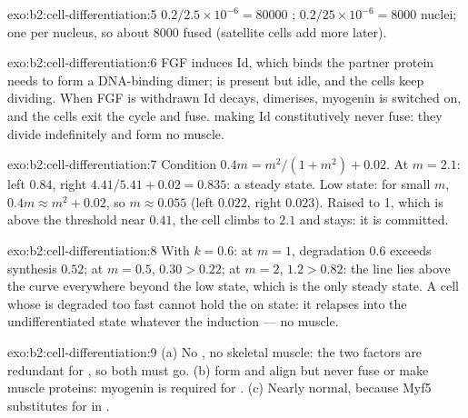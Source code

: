 \begin{solution}{exo:b2:cell-differentiation:5}
$0.2/2.5\times 10^{-6} = \num{80000}$ ; $0.2/25\times 10^{-6}
= \num{8000}$ nuclei; one  per nucleus, so about \num{8000}
 fused (satellite cells add more later).
\end{solution}

\begin{solution}{exo:b2:cell-differentiation:6}
FGF induces Id, which binds the partner protein  needs to form a
DNA-binding dimer;  is present but idle, and the cells keep
dividing. When FGF is withdrawn Id decays,  dimerises, myogenin
is switched on, and the cells exit the cycle and fuse. 
making Id constitutively never fuse: they divide indefinitely and
form no muscle.
\end{solution}

\begin{solution}{exo:b2:cell-differentiation:7}
Condition $0.4m = m^{2}/(1 + m^{2}) + 0.02$. At $m = 2.1$: left
$0.84$, right $4.41/5.41 + 0.02 = 0.835$: a steady state. Low
state: for small $m$, $0.4m \approx m^{2} + 0.02$, so $m \approx
0.055$ (left $0.022$, right $0.023$). Raised to 1, which is above
the threshold near $0.41$, the cell climbs to $2.1$ and stays: it is
committed.
\end{solution}

\begin{solution}{exo:b2:cell-differentiation:8}
With $k = 0.6$: at $m = 1$, degradation $0.6$ exceeds synthesis
$0.52$; at $m = 0.5$, $0.30 > 0.22$; at $m = 2$, $1.2 > 0.82$: the
line lies above the curve everywhere beyond the low state, which is
the only steady state. A cell whose  is degraded too fast
cannot hold the on state: it relapses into the undifferentiated
state whatever the induction --- no muscle.
\end{solution}

\begin{solution}{exo:b2:cell-differentiation:9}
(a) No , no skeletal muscle: the two factors are redundant
for , so both must go. (b)  form and align
but never fuse or make muscle proteins: myogenin is required for
. (c) Nearly normal, because Myf5 substitutes for
 in .
\end{solution}

